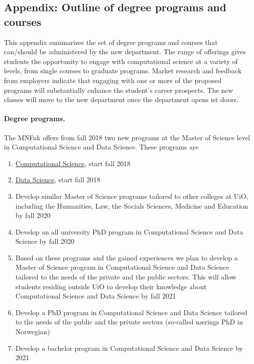 \documentclass[oneside,final,10pt]{article}
\begin{document}
\subsection*{Appendix:  Outline of degree programs and courses}

This appendix summarizes the set of degree programs and courses that
can/should be administered by the new department. The range of
offerings gives students the opportunity to engage with computational
science at a variety of levels, from single courses to graduate
programs. Market research and feedback from employers indicate that
engaging with one or more of the proposed programs will substantially
enhance the student's career prospects. The new classes will move to
the new department once the department opens ist doors.

\paragraph{Degree programs.}
The MNFak  offers from fall 2018 two new programs at the Master of Science level in Computational Science and Data Science. These programs are
\begin{enumerate}
\item \href{{http://www.uio.no/english/studies/programmes/computational-science-master/index.html}}{Computational Science}, start fall 2018

\item \href{{http://www.uio.no/english/studies/programmes/datascience-master/index.html}}{Data Science}, start fall 2018

\item Develop similar Master of Science programs tailored to other colleges at UiO, including the Humanities, Law, the Socials Sciences, Medicine and Education by fall 2020

\item Develop an all university PhD program in Computational Science and Data Science by fall 2020

\item Based on these programs and the gained experiences we plan to develop a Master of Science program in Computational Science and Data Science tailored to the needs of the private and the public sectors. This will allow students residing outside UiO to develop their knowledge about Computational Science and Data Science by fall 2021

\item Develop a PhD program in Computational Science and Data Science tailored to the needs of the public and the private sectors (so-called nærings PhD in Norwegian)

\item Develop a bachelor program in Computational Science and Data Science by 2021
\end{enumerate}
\end{document}
